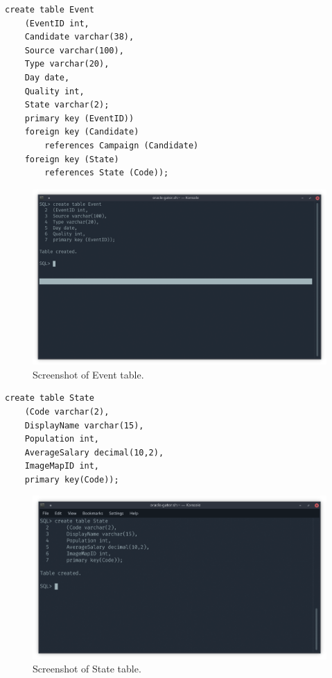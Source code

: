 \documentclass[12pt]{article}
\begin{document}
\pagebreak[4]
\begin{verbatim}
create table Event
    (EventID int,
    Candidate varchar(38),
    Source varchar(100),
    Type varchar(20),
    Day date,
    Quality int,
    State varchar(2);
    primary key (EventID))
    foreign key (Candidate)
        references Campaign (Candidate)
    foreign key (State)
        references State (Code));
\end{verbatim}
    \begin{figure}[H]
        \begin{center}
        \includegraphics[scale=.40]{event}
        \caption{Screenshot of Event table.}
        \label{fig:event}
        \end{center}
    \end{figure}
\begin{verbatim}
create table State
    (Code varchar(2),
    DisplayName varchar(15),
    Population int,
    AverageSalary decimal(10,2),
    ImageMapID int,
    primary key(Code));
\end{verbatim}
    \begin{figure}[H]
        \begin{center}
        \includegraphics[scale=.40]{state}
        \caption{Screenshot of State table.}
        \label{fig:state}
        \end{center}
    \end{figure}
\end{document}
